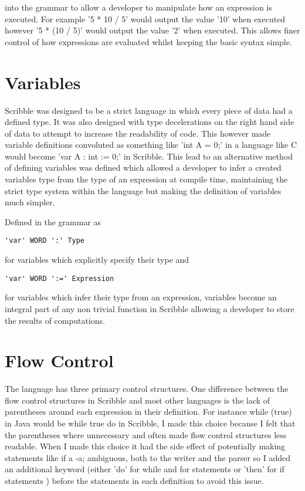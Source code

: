 \documentclass[]{final_report}
\begin{document}
into the grammar to allow a developer to manipulate how an expression is executed. For example '5 * 10 / 5' would output the value '10' when executed however '5 * (10 / 5)' would output the value '2' when executed. This allows finer control of how expressions are evaluated whilst keeping the basic syntax simple.

\section{Variables}

Scribble was designed to be a strict language in which every piece of data had a defined type. It was also designed with type decelerations on the right hand side of data to attempt to increase the readability of code. This however made variable definitions convoluted as something like 'int A = 0;' in a language like C would become 'var A : int := 0;' in Scribble. This lead to an alternative method of defining variables was defined which allowed a developer to infer a created variables type from the type of an expression at compile time, maintaining the strict type system within the language but making the definition of variables much simpler.

Defined in the grammar as

\begin{verbatim}
'var' WORD ':' Type 
\end{verbatim}

for variables which explicitly specify their type and

\begin{verbatim}
'var' WORD ':=' Expression
\end{verbatim}

for variables which infer their type from an expression, variables become an integral part of any non trivial function in Scribble allowing a developer to store the results of computations.

\section{Flow Control}

The language has three primary control structures. One difference between the flow control structures in Scribble and most other languages is the lack of parentheses around each expression in their definition. For instance while (true) { } in Java would be while true do { } in Scribble, I made this choice because I felt that the parentheses where unnecessary and often made flow control structures less readable. When I made this choice it had the side effect of potentially making statements like if a -a; ambiguous, both to the writer and the parser so I added an additional keyword (either 'do' for while and for statements or 'then' for if statements ) before the statements in each definition to avoid this issue.
\end{document}
